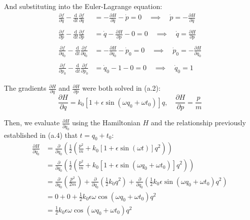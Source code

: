 \documentclass[titlepage]{article}
\begin{document}
And substituting into the Euler-Lagrange equation:
\begin{equation}
	\begin{split}
		\frac{\partial f}{\partial q}-\frac{\mathrm{d}}{\mathrm{d}t}\frac{\partial f}{\partial\dot{q}}&=-\frac{\partial H}{\partial q}-\dot{p}=0\quad\implies\quad\dot{p}=-\frac{\partial H}{\partial q} \\
		\\
		\frac{\partial f}{\partial p}-\frac{\mathrm{d}}{\mathrm{d}t}\frac{\partial f}{\partial\dot{p}}&=\dot{q}-\frac{\partial H}{\partial p}-0=0\quad\implies\quad\dot{q}=\frac{\partial H}{\partial p} \\
		\\
		\frac{\partial f}{\partial q_0}-\frac{\mathrm{d}}{\mathrm{d}t}\frac{\partial f}{\partial\dot{q}_0}&=-\frac{\partial H}{\partial q_0}-\dot{p}_0=0\quad\implies\quad\dot{p}_0=-\frac{\partial H}{\partial q_0} \\
		\\
		\frac{\partial f}{\partial p_0}-\frac{\mathrm{d}}{\mathrm{d}t}\frac{\partial f}{\partial\dot{p}_0}&=\dot{q}_0-1-0=0\quad\implies\quad\dot{q}_0=1
	\end{split}
\end{equation}

The gradients $\frac{\partial H}{\partial q}$ and $\frac{\partial H}{\partial p}$ were both solved in (a.2):
\begin{equation}
\frac{\partial H}{\partial q}=k_0\left[1+\epsilon\sin\left(\omega q_0+\omega t_0\right)\right]q,\quad\frac{\partial H}{\partial p}=\frac{p}{m}
\end{equation}

Then, we evaluate $\frac{\partial H}{\partial q_0}$ using the Hamiltonian $H$ and the relationship previously established in (a.4) that $t=q_0+t_0$:
\begin{equation}
	\begin{split}
		\frac{\partial H}{\partial q_0}&=\frac{\partial}{\partial q_0}\left(\frac{1}{2}\left(\frac{p^2}{m}+k_0\left[1+\epsilon\sin\left(\omega t\right)\right]q^2\right)\right) \\
		&= \frac{\partial}{\partial q_0}\left(\frac{1}{2}\left(\frac{p^2}{m}+k_0\left[1+\epsilon\sin\left(\omega q_0+\omega t_0\right)\right]q^2\right)\right) \\
		&=\frac{\partial}{\partial q_0}\left(\frac{p^2}{2m}\right)+\frac{\partial}{\partial q_0}\left(\frac{1}{2}k_0q^2\right)+\frac{\partial}{\partial q_0}\left(\frac{1}{2}k_0\epsilon\sin\left(\omega q_0+\omega t_0\right)q^2\right) \\
		&=0+0+\frac{1}{2}k_0\epsilon\omega\cos\left(\omega q_0+\omega t_0\right)q^2 \\
		&=\frac{1}{2}k_0\epsilon\omega\cos\left(\omega q_0+\omega t_0\right)q^2
	\end{split}
\end{equation}
\end{document}
